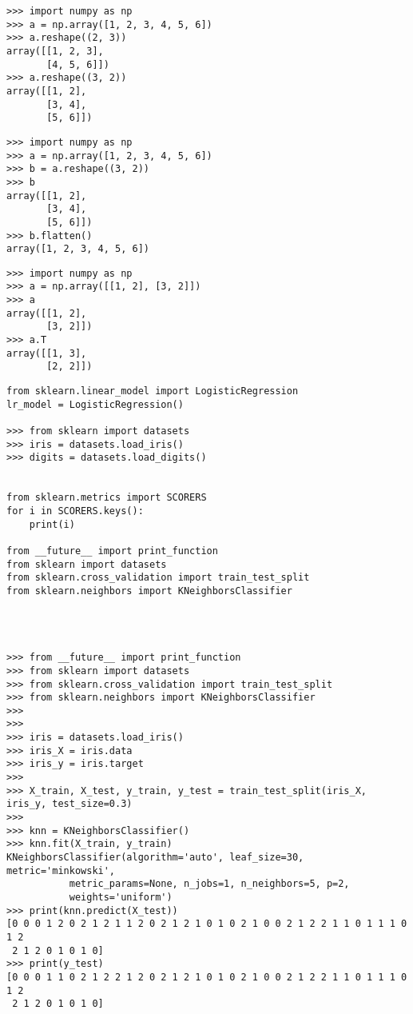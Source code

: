 \documentclass[10pt,a4paper]{ctexbook}
\begin{document}
\begin{verbatim}
>>> import numpy as np
>>> a = np.array([1, 2, 3, 4, 5, 6])
>>> a.reshape((2, 3))
array([[1, 2, 3],
       [4, 5, 6]])
>>> a.reshape((3, 2))
array([[1, 2],
       [3, 4],
       [5, 6]])
\end{verbatim}

\begin{verbatim}
>>> import numpy as np
>>> a = np.array([1, 2, 3, 4, 5, 6])
>>> b = a.reshape((3, 2))
>>> b
array([[1, 2],
       [3, 4],
       [5, 6]])
>>> b.flatten()
array([1, 2, 3, 4, 5, 6])
\end{verbatim}

\begin{verbatim}
>>> import numpy as np
>>> a = np.array([[1, 2], [3, 2]])
>>> a
array([[1, 2],
       [3, 2]])
>>> a.T
array([[1, 3],
       [2, 2]])
\end{verbatim}


\begin{verbatim}
from sklearn.linear_model import LogisticRegression
lr_model = LogisticRegression()

>>> from sklearn import datasets
>>> iris = datasets.load_iris()
>>> digits = datasets.load_digits()


from sklearn.metrics import SCORERS
for i in SCORERS.keys():
    print(i)

from __future__ import print_function
from sklearn import datasets
from sklearn.cross_validation import train_test_split
from sklearn.neighbors import KNeighborsClassifier




>>> from __future__ import print_function
>>> from sklearn import datasets
>>> from sklearn.cross_validation import train_test_split
>>> from sklearn.neighbors import KNeighborsClassifier
>>> 
>>> 
>>> iris = datasets.load_iris()
>>> iris_X = iris.data
>>> iris_y = iris.target
>>> 
>>> X_train, X_test, y_train, y_test = train_test_split(iris_X, iris_y, test_size=0.3)
>>> 
>>> knn = KNeighborsClassifier()
>>> knn.fit(X_train, y_train)
KNeighborsClassifier(algorithm='auto', leaf_size=30, metric='minkowski',
           metric_params=None, n_jobs=1, n_neighbors=5, p=2,
           weights='uniform')
>>> print(knn.predict(X_test))
[0 0 0 1 2 0 2 1 2 1 1 2 0 2 1 2 1 0 1 0 2 1 0 0 2 1 2 2 1 1 0 1 1 1 0 1 2
 2 1 2 0 1 0 1 0]
>>> print(y_test)
[0 0 0 1 1 0 2 1 2 2 1 2 0 2 1 2 1 0 1 0 2 1 0 0 2 1 2 2 1 1 0 1 1 1 0 1 2
 2 1 2 0 1 0 1 0]
\end{verbatim}

\ifx\mlbook\undefined
    
\end{document}
